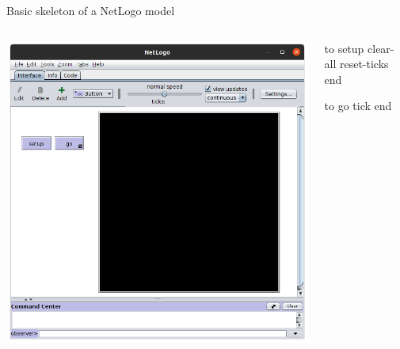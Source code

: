 \documentclass[table, 14pt, aspectratio=169]{beamer}
\begin{document}
\begin{frame}[fragile=singleslide]{Basic skeleton of a NetLogo model}
  \begin{columns}
    \begin{column}{0.55\textwidth}
      \includegraphics[height=0.8\textheight]{images/skeleton}\\
    \end{column}
    \begin{column}{0.45\textwidth}
      \begin{adjustbox}{max width=\linewidth}
        \begin{nlogo}
 to setup
   clear-all
   reset-ticks
 end

 to go
   tick
 end
        \end{nlogo}
      \end{adjustbox}
    \end{column}
  \end{columns}  
\end{frame}
\end{document}
